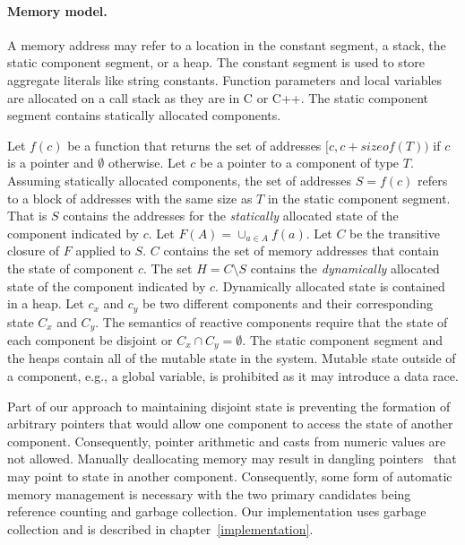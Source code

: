 \paragraph{Memory model.}
A memory address may refer to a location in the constant segment, a stack, the static component segment, or a heap.
The constant segment is used to store aggregate literals like string constants.
Function parameters and local variables are allocated on a call stack as they are in C or C++.
The static component segment contains statically allocated components.

Let $f(c)$ be a function that returns the set of addresses $[c,c+sizeof(T))$ if $c$ is a pointer and $\emptyset$ otherwise.
Let $c$ be a pointer to a component of type $T$.
Assuming statically allocated components, the set of addresses $S = f(c)$ refers to a block of addresses with the same size as $T$ in the static component segment.
That is $S$ contains the addresses for the \emph{statically} allocated state of the component indicated by $c$.
Let $F(A) = \cup_{a \in A} f(a)$.
Let $C$ be the transitive closure of $F$ applied to $S$.
$C$ contains the set of memory addresses that contain the state of component $c$.
The set $H = C \setminus S$ contains the \emph{dynamically} allocated state of the component indicated by $c$.
Dynamically allocated state is contained in a heap.
Let $c_x$ and $c_y$ be two different components and their corresponding state $C_x$ and $C_y$.
The semantics of reactive components require that the state of each component be disjoint or $C_x \cap C_y = \emptyset$.
The static component segment and the heaps contain all of the mutable state in the system.
Mutable state outside of a component, e.g., a global variable, is prohibited as it may introduce a data race.

Part of our approach to maintaining disjoint state is preventing the formation of arbitrary pointers that would allow one component to access the state of another component.
Consequently, pointer arithmetic and casts from numeric values are not allowed.
Manually deallocating memory may result in dangling pointers~\cite{dangle} that may point to state in another component.
Consequently, some form of automatic memory management is necessary with the two primary candidates being reference counting and garbage collection.
Our implementation uses garbage collection and is described in chapter~\ref{implementation}.


